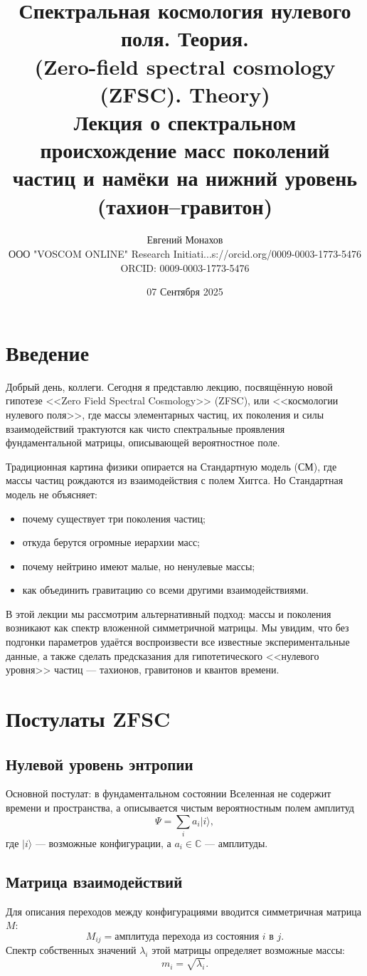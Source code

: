 \documentclass[12pt,a4paper]{article}
\title{Спектральная космология нулевого поля. Теория.\\
(Zero-field spectral cosmology (ZFSC). Theory)\\
Лекция о спектральном происхождение масс поколений частиц и намёки на нижний уровень (тахион--гравитон)}
\author{Евгений Монахов \\ ООО "VOSCOM ONLINE" Research Initiati...s://orcid.org/0009-0003-1773-5476 \\ ORCID: 0009-0003-1773-5476}
\date{07 Сентября 2025}
\begin{document}
\maketitle

\section*{Введение}
Добрый день, коллеги. Сегодня я представлю лекцию, посвящённую новой гипотезе <<Zero Field Spectral Cosmology>> (ZFSC), или <<космологии нулевого поля>>, где массы элементарных частиц, их поколения и силы взаимодействий трактуются как чисто спектральные проявления фундаментальной матрицы, описывающей вероятностное поле.

Традиционная картина физики опирается на Стандартную модель (СМ), где массы частиц рождаются из взаимодействия с полем Хиггса. Но Стандартная модель не объясняет:
\begin{itemize}
  \item почему существует три поколения частиц;
  \item откуда берутся огромные иерархии масс;
  \item почему нейтрино имеют малые, но ненулевые массы;
  \item как объединить гравитацию со всеми другими взаимодействиями.
\end{itemize}

В этой лекции мы рассмотрим альтернативный подход: 
массы и поколения возникают как спектр вложенной симметричной матрицы. 
Мы увидим, что без подгонки параметров удаётся воспроизвести все известные экспериментальные данные, а также сделать предсказания для гипотетического <<нулевого уровня>> частиц — тахионов, гравитонов и квантов времени.

\section{Постулаты ZFSC}
\subsection{Нулевой уровень энтропии}
Основной постулат: в фундаментальном состоянии Вселенная не содержит времени и пространства, а описывается чистым вероятностным полем амплитуд
\[
\Psi = \sum_i a_i | i \rangle,
\]
где $|i\rangle$ --- возможные конфигурации, а $a_i \in \mathbb{C}$ --- амплитуды.

\subsection{Матрица взаимодействий}
Для описания переходов между конфигурациями вводится симметричная матрица $M$:
\[
M_{ij} = \text{амплитуда перехода из состояния $i$ в $j$}.
\]
Спектр собственных значений $\lambda_i$ этой матрицы определяет возможные массы:
\[
m_i = \sqrt{\lambda_i}.
\]
\end{document}
